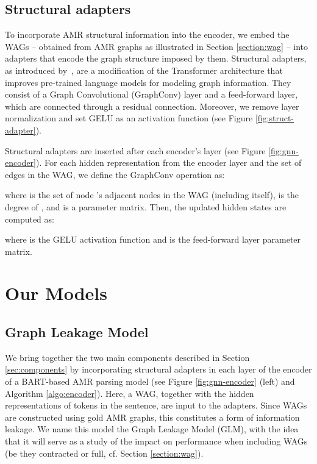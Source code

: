 \documentclass[11pt]{article}
\begin{document}
\subsection{Structural adapters}

To incorporate AMR structural information into the encoder, we embed the WAGs -- obtained from AMR graphs as illustrated in Section \ref{section:wag} -- into adapters that encode the graph structure imposed by them. Structural adapters, as introduced by~\citet{struct-adapt}, are a modification of the Transformer architecture that improves pre-trained language models for modeling graph information. They consist of a Graph Convolutional (GraphConv) layer and a feed-forward layer, which are connected through a residual connection. Moreover, we remove layer normalization and set GELU as an activation function (see Figure \ref{fig:struct-adapter}). 

Structural adapters are inserted after each encoder's layer (see Figure \ref{fig:gnn-encoder}). For each hidden representation  from the encoder layer  and the set of edges  in the WAG, we define the GraphConv operation as:


where  is the set of node 's adjacent nodes in the WAG (including  itself),  is the degree of , and  is a parameter matrix.
Then, the updated hidden states  are computed as:

where  is the GELU activation function and  is the feed-forward layer parameter matrix.

\section{Our Models}
\subsection{Graph Leakage Model}\label{section:GLM}

We bring together the two main components described in Section \ref{sec:components} by incorporating structural adapters in each layer of the encoder of a BART-based AMR parsing model (see Figure \ref{fig:gnn-encoder} (left) and Algorithm \ref{algo:encoder}). Here, a WAG, together with the hidden representations of tokens in the sentence, are input to the adapters. Since WAGs are constructed using gold AMR graphs, this constitutes a form of information leakage. We name this model the Graph Leakage Model (GLM), with the idea that it will serve as a study of the impact on performance when including WAGs (be they contracted or full, cf. Section \ref{section:wag}). 
\end{document}

